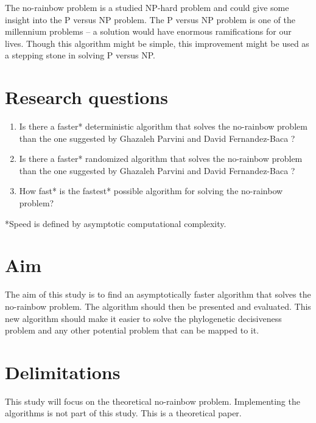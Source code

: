 \documentclass[msc,lith,english]{liuthesis}
\begin{document}
The no-rainbow problem is a studied NP-hard problem and could give some insight into the P versus NP problem.
The P versus NP problem is one of the millennium problems -- a solution would have enormous ramifications for our lives.
Though this algorithm might be simple, this improvement might be used as a
stepping stone in solving P versus NP.


\section{Research questions}
\begin{enumerate}
  \item Is there a faster* deterministic algorithm that solves the no-rainbow problem than the one suggested by Ghazaleh Parvini and David Fernandez-Baca \cite{sourceNoRainbow}?
  \item Is there a faster* randomized algorithm that solves the no-rainbow problem than the one suggested by Ghazaleh Parvini and David Fernandez-Baca \cite{sourceNoRainbow}?
  \item How fast* is the fastest* possible algorithm for solving the no-rainbow problem? 
\end{enumerate}
*Speed is defined by asymptotic computational complexity.

\section{Aim}
The aim of this study is to find an asymptotically faster algorithm that solves
the no-rainbow problem. The algorithm should then be presented and evaluated.
This new algorithm should make it easier to solve the phylogenetic decisiveness
problem and any other potential problem that can be mapped to it.

\section{Delimitations}
This study will focus on the theoretical no-rainbow problem.
Implementing the algorithms is not part of this study.
This is a theoretical paper.
\end{document}

